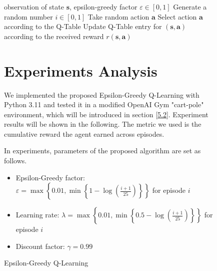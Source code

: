 \documentclass[10pt,a4paper]{article}
\begin{document}
\begin{figure}[H]
	\begin{algorithm}
		\caption{Epsilon-Greedy Q-Learning}\label{alg:egql}
		\begin{algorithmic}
			\Require observation of state $\boldsymbol{s}$, epsilon-greedy factor $\varepsilon \in [0,1]$
			\State Generate a random number $i \in [0,1]$
			\State Take random action $\boldsymbol{a}$
			\Else
			\State Select action $\boldsymbol{a}$ according to the Q-Table 
			\EndIf
			\State Update Q-Table entry for $(\boldsymbol{s}, \boldsymbol{a})$ according to the received reward $r(\boldsymbol{s}, \boldsymbol{a})$ 
			\EndWhile
		\end{algorithmic}
	\end{algorithm}
	
	\section{Experiments Analysis}
	We implemented the proposed Epsilon-Greedy Q-Learning with Python 3.11 and tested it in a modified OpenAI Gym "cart-pole" environment, which will be introduced in section \ref{5.2}. Experiment results will be shown in the following. The metric we used is the cumulative reward the agent earned across episodes. 
	
	In experiments, parameters of the proposed algorithm are set as follows. 
	\begin{itemize}
		\item Epsilon-Greedy factor: $\varepsilon = \max\left\{0.01, \min\left\{1-\log\left(\frac{i+1}{25}\right)\right\}\right\}$ for episode $i$
		\item Learning rate: $\lambda = \max\left\{0.01, \min\left\{0.5-\log\left(\frac{i+1}{25}\right)\right\}\right\}$ for episode $i$
		\item Discount factor: $\gamma = 0.99$ 
	\end{itemize}
	

\end{figure}
\end{document}
